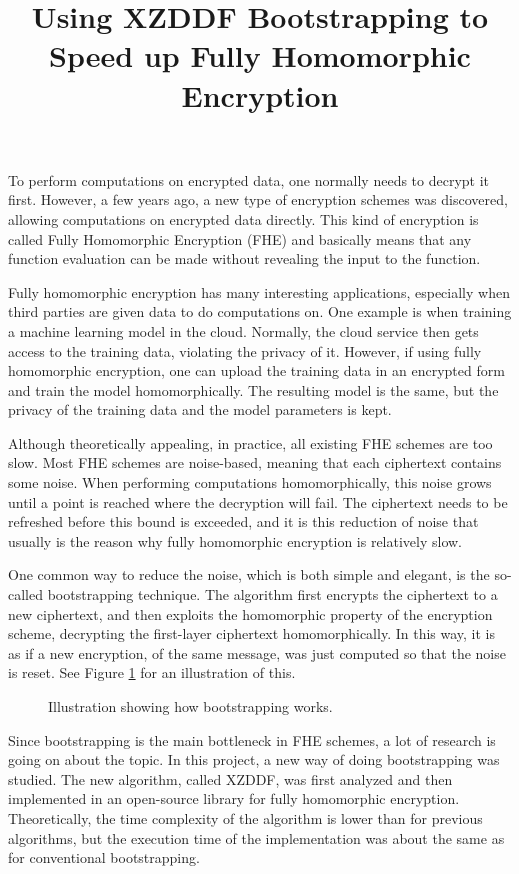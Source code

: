 \documentclass{popsci}
\title{Using XZDDF Bootstrapping to Speed up Fully Homomorphic Encryption}
\begin{document}


{\noindent 
To perform computations on encrypted data, one normally needs to decrypt it first. However, a few years ago, a new type of encryption schemes was discovered, allowing computations on encrypted data directly. This kind of encryption is called Fully Homomorphic Encryption (FHE) and basically means that any function evaluation can be made without revealing the input to the function.

Fully homomorphic encryption has many interesting applications, especially when third parties are given data to do computations on. One example is when training a machine learning model in the cloud. Normally, the cloud service then gets access to the training data, violating the privacy of it. However, if using fully homomorphic encryption, one can upload the training data in an encrypted form and train the model homomorphically. The resulting model is the same, but the privacy of the training data and the model parameters is kept.

Although theoretically appealing, in practice, all existing FHE schemes are too slow. Most FHE schemes are noise-based, meaning that each ciphertext contains some noise. When performing computations homomorphically, this noise grows until a point is reached where the decryption will fail. The ciphertext needs to be refreshed before this bound is exceeded, and it is this reduction of noise that usually is the reason why fully homomorphic encryption is relatively slow.

One common way to reduce the noise, which is both simple and elegant, is the so-called bootstrapping technique. The algorithm first encrypts the ciphertext to a new ciphertext, and then exploits the homomorphic property of the encryption scheme, decrypting the first-layer ciphertext homomorphically. In this way, it is as if a new encryption, of the same message, was just computed so that the noise is reset. See Figure \ref{fig:bs_tikz} for an illustration of this.

\begin{figure}[!bth]
\centering\resizebox{\columnwidth}{!}{%
        
}
\caption{Illustration showing how bootstrapping works.}
\label{fig:bs_tikz}

\end{figure}



Since bootstrapping is the main bottleneck in FHE schemes, a lot of research is going on about the topic. In this project, a new way of doing bootstrapping was studied. The new algorithm, called XZDDF, was first analyzed and then implemented in an open-source library for fully homomorphic encryption. Theoretically, the time complexity of the algorithm is lower than for previous algorithms, but the execution time of the implementation was about the same as for conventional bootstrapping.
}
\end{document}
